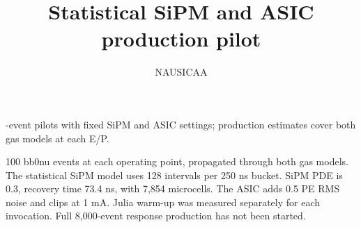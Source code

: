 \documentclass[10pt,a4paper]{article}
\begin{document}
\title{Statistical SiPM and ASIC production pilot}\author{NAUSICAA}\date{}-event pilots with fixed SiPM and ASIC settings; production estimates cover both gas models at each E/P.

100 bb0nu events at each operating point, propagated through both gas models. The statistical SiPM model uses 128 intervals per 250 ns bucket. SiPM PDE is 0.3, recovery time 73.4 ns, with 7,854 microcells. The ASIC adds 0.5 PE RMS noise and clips at 1 mA. Julia warm-up was measured separately for each invocation. Full 8,000-event response production has not been started.
\begin{center}\end{center}
\end{document}

